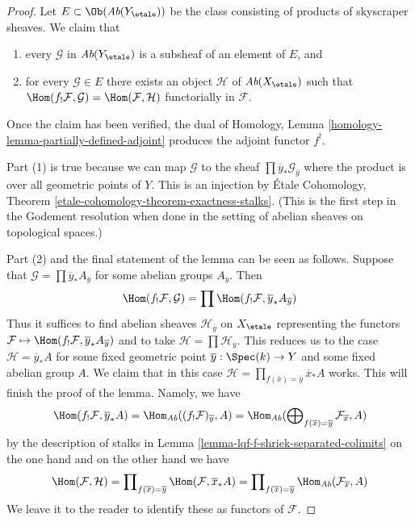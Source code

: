 \begin{proof}
Let $E \subset \Ob(\textit{Ab}(Y_\etale))$ be the class consisting of
products of skyscraper sheaves. We claim that
\begin{enumerate}
\item every $\mathcal{G}$ in $\textit{Ab}(Y_\etale)$ is a subsheaf
of an element of $E$, and
\item for every $\mathcal{G} \in E$ there exists an object
$\mathcal{H}$ of $\textit{Ab}(X_\etale)$ such that
$\Hom(f_!\mathcal{F}, \mathcal{G}) = \Hom(\mathcal{F}, \mathcal{H})$
functorially in $\mathcal{F}$.
\end{enumerate}
Once the claim has been verified, the dual of
Homology, Lemma \ref{homology-lemma-partially-defined-adjoint}
produces the adjoint functor $f^!$.

\medskip\noindent
Part (1) is true because we can map $\mathcal{G}$ to the sheaf
$\prod \overline{y}_*\mathcal{G}_{\overline{y}}$ where the
product is over all geometric points of $Y$. This is an injection by
\'Etale Cohomology, Theorem \ref{etale-cohomology-theorem-exactness-stalks}.
(This is the first step in the Godement resolution when
done in the setting of abelian sheaves on topological spaces.)

\medskip\noindent
Part (2) and the final statement of the lemma can be seen as follows.
Suppose that
$\mathcal{G} = \prod \overline{y}_*A_{\overline{y}}$
for some abelian groups $A_{\overline{y}}$. Then
$$
\Hom(f_!\mathcal{F}, \mathcal{G}) =
\prod \Hom(f_!\mathcal{F}, \overline{y}_*A_{\overline{y}})
$$
Thus it suffices to find abelian sheaves $\mathcal{H}_{\overline{y}}$
on $X_\etale$ representing the functors
$\mathcal{F} \mapsto \Hom(f_!\mathcal{F}, \overline{y}_*A_{\overline{y}})$
and to take $\mathcal{H} = \prod \mathcal{H}_{\overline{y}}$.
This reduces us to the case $\mathcal{H} = \overline{y}_*A$
for some fixed geometric point $\overline{y} : \Spec(k) \to Y$
and some fixed abelian group $A$. We claim that in this case
$\mathcal{H} = \prod_{f(\overline{x}) = \overline{y}} \overline{x}_*A$ works.
This will finish the proof of the lemma.
Namely, we have
$$
\Hom(f_!\mathcal{F}, \overline{y}_*A) =
\Hom_{\textit{Ab}}((f_!\mathcal{F})_{\overline{y}}, A) =
\Hom_{\textit{Ab}}(\bigoplus\nolimits_{f(\overline{x}) = \overline{y}}
\mathcal{F}_{\overline{x}}, A)
$$
by the description of stalks in
Lemma \ref{lemma-lqf-f-shriek-separated-colimits}
on the one hand and on the other hand we have
$$
\Hom(\mathcal{F}, \mathcal{H}) =
\prod\nolimits_{f(\overline{x}) = \overline{y}}
\Hom(\mathcal{F}, \overline{x}_*A) =
\prod\nolimits_{f(\overline{x}) = \overline{y}}
\Hom_{\textit{Ab}}(\mathcal{F}_{\overline{x}}, A)
$$
We leave it to the reader to identify these as functors of $\mathcal{F}$.
\end{proof}

